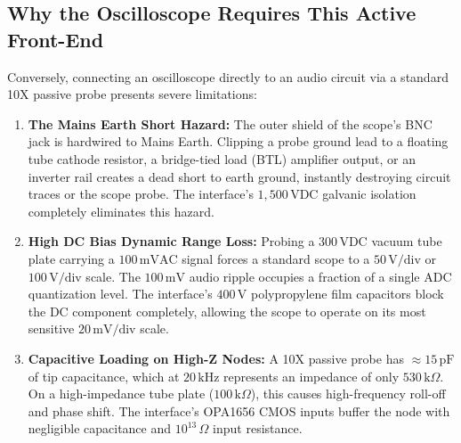 \documentclass[11pt, letterpaper]{article}
\begin{document}
\subsection{Why the Oscilloscope Requires This Active Front-End}
Conversely, connecting an oscilloscope directly to an audio circuit via a standard 10X passive probe presents severe limitations:
\begin{enumerate}[label=\textbf{\alph*.}]
    \item \textbf{The Mains Earth Short Hazard:} The outer shield of the scope's BNC jack is hardwired to Mains Earth. Clipping a probe ground lead to a floating tube cathode resistor, a bridge-tied load (BTL) amplifier output, or an inverter rail creates a dead short to earth ground, instantly destroying circuit traces or the scope probe. The interface's $1,500\,\text{VDC}$ galvanic isolation completely eliminates this hazard.
    \item \textbf{High DC Bias Dynamic Range Loss:} Probing a $300\,\text{VDC}$ vacuum tube plate carrying a $100\,\text{mVAC}$ signal forces a standard scope to a $50\,\text{V}/\text{div}$ or $100\,\text{V}/\text{div}$ scale. The $100\,\text{mV}$ audio ripple occupies a fraction of a single ADC quantization level. The interface's $400\,\text{V}$ polypropylene film capacitors block the DC component completely, allowing the scope to operate on its most sensitive $20\,\text{mV}/\text{div}$ scale.
    \item \textbf{Capacitive Loading on High-Z Nodes:} A 10X passive probe has $\approx 15\,\text{pF}$ of tip capacitance, which at $20\,\text{kHz}$ represents an impedance of only $530\,\text{k}\Omega$. On a high-impedance tube plate ($100\,\text{k}\Omega$), this causes high-frequency roll-off and phase shift. The interface's OPA1656 CMOS inputs buffer the node with negligible capacitance and $10^{13}\,\Omega$ input resistance.
\end{enumerate}
\end{document}
